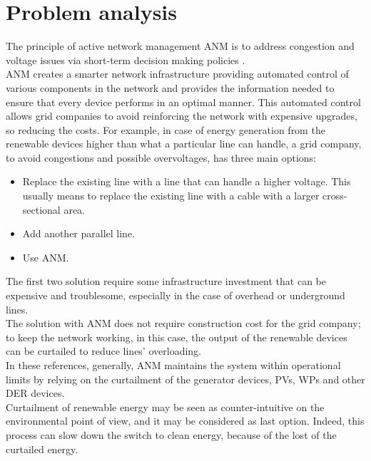 \chapter{Problem analysis}
\label{chapter4}
The principle of active network management \gls{ANM} is to address congestion and voltage issues via short-term decision making policies \cite{ANMQuentin}. \\
\gls{ANM} creates a smarter network infrastructure providing automated control of various components in the network and provides the information needed to ensure that every device performs in an optimal manner. This automated control allows grid companies to avoid reinforcing the network with expensive upgrades, so reducing the costs.
For example, in case of energy generation from the renewable devices higher than what a particular line can handle, a grid company, to avoid congestions and possible overvoltages, has three main options:
\begin{itemize}
    \item Replace the existing line with a line that can handle a higher voltage. This usually means to replace the existing line with a cable with a larger cross-sectional area.
    \item Add another parallel line.
    \item Use \gls{ANM}.
\end{itemize}
The first two solution require some infrastructure investment that can be expensive and troublesome, especially in the case of overhead or underground lines.\\
The solution with \gls{ANM} does not require construction cost for the grid company; to keep the network working, in this case, the output of the renewable devices can be curtailed to reduce lines' overloading. \\

In these references, generally, \gls{ANM} maintains the system within operational limits by relying on the curtailment of the generator devices, \glspl{PV}, \glspl{WP} and other \gls{DER} devices. \\
Curtailment of renewable energy may be seen as counter-intuitive on the environmental point of view, and it may be considered as last option. Indeed, this process can slow down the switch to clean energy, because of the lost of the curtailed energy. \\

